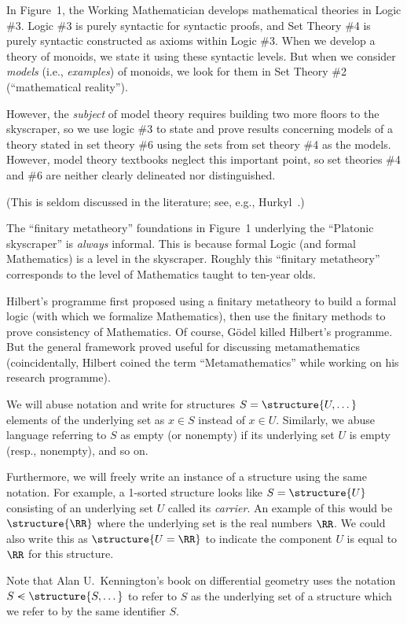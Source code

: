 \begin{remark}
In Figure~1, the Working Mathematician develops mathematical theories
in Logic \#3. Logic \#3 is purely syntactic for syntactic proofs, and
Set Theory \#4 is purely syntactic constructed as axioms within Logic \#3.
When we develop a theory of monoids, we state it using these syntactic
levels. But when we consider \emph{models} (i.e., \emph{examples}) of
monoids, we look for them in Set Theory \#2 (``mathematical reality'').

However, the \emph{subject} of model theory requires building two more
floors to the skyscraper, so we use logic \#3 to state and prove
results concerning models of a theory stated in set theory \#6 using
the sets from set theory \#4 as the models. However, model theory
textbooks neglect this important point, so set theories \#4 and \#6
are neither clearly delineated nor distinguished.

(This is seldom discussed in the literature; see, e.g.,
Hurkyl~\cite{hurkyl2012avoid}.) 
\end{remark}

\begin{remark}
The ``finitary metatheory'' foundations in Figure~1 underlying the
``Platonic skyscraper'' is \emph{always} informal. This is because
formal Logic (and formal Mathematics) is a level in the skyscraper.
Roughly this ``finitary metatheory'' corresponds to the level of
Mathematics taught to ten-year olds.

Hilbert's programme first proposed using a finitary metatheory to
build a formal logic (with which we formalize Mathematics), then use
the finitary methods to prove consistency of Mathematics. Of course,
G\"{o}del killed Hilbert's programme. But the general framework proved
useful for discussing metamathematics (coincidentally, Hilbert coined
the term ``Metamathematics'' while working on his research programme).
\end{remark}

\begin{remark}
We will abuse notation and write for structures $S=\structure{U,\dots}$
elements of the underlying set as $x\in S$ instead of $x\in U$.
Similarly, we abuse language referring to $S$ as empty (or nonempty)
if its underlying set $U$ is empty (resp., nonempty), and so on.

Furthermore, we will freely write an instance of a structure using the
same notation. For example, a 1-sorted structure looks like
$S=\structure{U}$ consisting of an underlying set $U$ called its
\emph{carrier}. An example of this would be $\structure{\RR}$ where
the underlying set is the real numbers $\RR$. We could also write this
as $\structure{U = \RR}$ to indicate the component $U$ is equal to
$\RR$ for this structure.

Note that Alan U.\ Kennington's book on differential geometry uses the
notation $S\smt\structure{S,\dots}$ to refer to $S$ as the underlying
set of a structure which we refer to by the same identifier $S$.
\end{remark}

